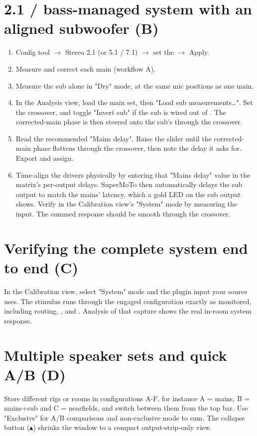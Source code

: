\section{2.1 / bass-managed system with an aligned subwoofer (B)}
\begin{enumerate}[nosep]
  \item Config tool $\rightarrow$ Stereo 2.1 (or 5.1 / 7.1) $\rightarrow$ set the  $\rightarrow$ Apply.
  \item Measure and correct each main (workflow A).
  \item Measure the sub alone in "Dry" mode, at the same mic positions as one main.
  \item In the Analysis view, load the main set, then "Load sub measurements\ldots". Set the crossover, and toggle "Invert sub" if the sub is wired out of . The corrected-main phase is then steered onto the sub's through the crossover.
  \item Read the recommended "Mains delay". Raise the slider until the corrected-main phase flattens through the crossover, then note the delay it asks for. Export and assign.
  \item Time-align the drivers physically by entering that "Mains delay" value in the matrix's per-output delays. SuperMoTo then automatically delays the sub output to match the mains'  latency, which a gold LED on the sub output shows. Verify in the Calibration view's "System" mode by measuring the input. The summed response should be smooth through the crossover.
\end{enumerate}

\section{Verifying the complete system end to end (C)}
In the Calibration view, select "System" mode and the plugin input your source uses. The stimulus runs through the engaged configuration exactly as monitored, including routing, ,  and . Analysis of that capture shows the real in-room system response.

\section{Multiple speaker sets and quick A/B (D)}
Store different rigs or rooms in configurations A-F, for instance A = mains, B = mains+sub and C = nearfields, and switch between them from the top bar. Use "Exclusive" for A/B comparisons and non-exclusive mode to sum. The collapse button (\textbf{$\blacktriangle$}) shrinks the window to a compact output-strip-only view.

